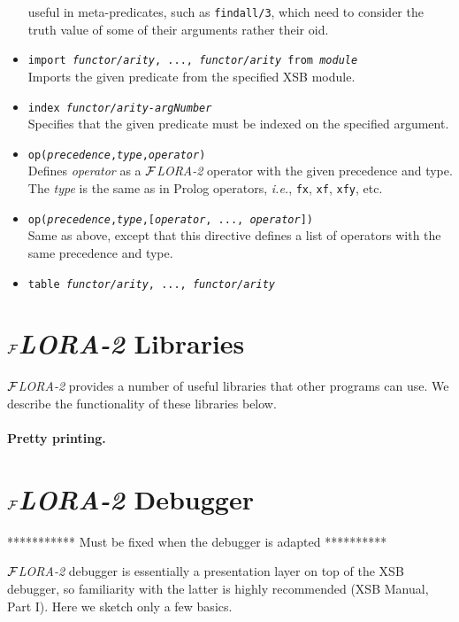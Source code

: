 \documentclass[11pt]{article}
\newcommand{\FLORA}{{\mbox{${\cal F}${\small\it LORA}\rm\emph{-2}}}\xspace}
\begin{document}
\begin{itemize}
  useful in meta-predicates, such as {\tt findall/3}, which need to
  consider the truth value of some of their arguments rather their oid.
\item {\tt import {\it functor/arity}, ..., {\it functor/arity} from
    {\it module}}
  \\
  Imports the given predicate from the specified XSB module.
\item {\tt index {\it functor/arity-argNumber}}
  \\
  Specifies that the given predicate must be indexed on the specified
  argument.
\item {\tt op({\it precedence},{\it type},{\it operator})}
  \\
  Defines \emph{operator} as a \FLORA operator with the given precedence
  and type. The \emph{type} is the same as in Prolog operators, {\it i.e.},
  {\tt fx}, {\tt xf}, {\tt xfy}, etc.
\item {\tt op({\it precedence},{\it type},[{\it operator}, ..., {\it operator}])}
  \\
  Same as above, except that this directive defines a list of operators
  with the same precedence and type.
\item {\tt table {\it functor/arity}, ..., {\it functor/arity}}
\end{itemize}


\section{\FLORA Libraries}

\FLORA provides a number of useful libraries that other programs can
use. We describe the functionality of these libraries below.

\paragraph{Pretty printing.}


\section{\FLORA Debugger}


*********** Must be fixed when the debugger is adapted **********


\FLORA debugger is essentially a presentation layer on top of the XSB
debugger, so familiarity with the latter is highly recommended (XSB Manual,
Part I). Here we sketch only a few basics.
\end{document}
